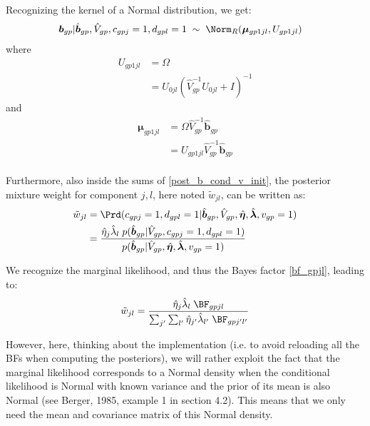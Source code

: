 \documentclass[11pt, oneside]{article}   	%
\begin{document}
Recognizing the kernel of a Normal distribution, we get:
\begin{equation}
  \label{post_b_jl}
  \begin{aligned}
    \bm{b}_{gp} | \hat{\bm{b}}_{gp}, \hat{V}_{gp}, c_{gpj}=1, d_{gpl}=1 \;  &\sim \; \Norm_R(\bm{\mu}_{gp1jl}, U_{gp1jl})
  \end{aligned}
\end{equation}
where
\begin{equation}
  \label{post_b_jl_covar}
  \begin{aligned}
    U_{gp1jl} &= \Omega \\
    &= U_{0jl} \left( \hat{V}_{gp}^{-1} U_{0jl} + I \right)^{-1}
  \end{aligned}
\end{equation}
and
\begin{equation}
  \label{post_b_jl_mean}
  \begin{aligned}
    \bm{\mu}_{gp1jl} &= \Omega \hat{V}_{gp}^{-1} \hat{\bm{b}}_{gp} \\
    &= U_{gp1jl} \hat{V}_{gp}^{-1} \hat{\bm{b}}_{gp} \\
  \end{aligned}
\end{equation}

Furthermore, also inside the sums of \ref{post_b_cond_v_init}, the posterior mixture weight for component $j,l$, here noted $\tilde{w}_{jl}$, can be written as:
\begin{equation}
  \label{post_w_jl_init}
  \begin{aligned}
    \tilde{w}_{jl} &= \Prd(c_{gpj}=1, d_{gpl}=1 | \hat{\bm{b}}_{gp}, \hat{V}_{gp}, \hat{\bm{\eta}}, \hat{\bm{\lambda}}, v_{gp}=1) \\
    &= \frac{\hat{\eta}_j \hat{\lambda}_l \; p(\hat{\bm{b}}_{gp} | \hat{V}_{gp}, c_{gpj}=1, d_{gpl}=1)}{p(\hat{\bm{b}}_{gp} | \hat{V}_{gp}, \hat{\bm{\eta}}, \hat{\bm{\lambda}}, v_{gp}=1)}
  \end{aligned}
\end{equation}

We recognize the marginal likelihood, and thus the Bayes factor \ref{bf_gpjl}, leading to:
\begin{equation}
  \tilde{w}_{jl} = \frac{\hat{\eta}_j \hat{\lambda}_l \; \BF_{gpjl}}{\sum_{j'} \sum_{l'} \hat{\eta}_{j'} \hat{\lambda}_{l'} \; \BF_{gpj'l'}}
\end{equation}

However, here, thinking about the implementation (i.e. to avoid reloading all the BFs when computing the posteriors), we will rather exploit the fact that the marginal likelihood corresponds to a Normal density when the conditional likelihood is Normal with known variance and the prior of its mean is also Normal (see Berger, 1985, example 1 in section 4.2).
This means that we only need the mean and covariance matrix of this Normal density.
\end{document}
